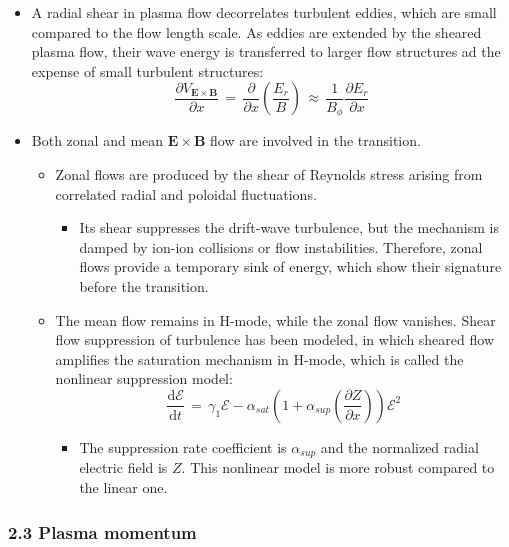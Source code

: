 \documentclass[]{article}
\providecommand{\tightlist}{%
  \setlength{\itemsep}{0pt}\setlength{\parskip}{0pt}}
\begin{document}
\begin{itemize}
\item
  A radial shear in plasma flow decorrelates turbulent eddies, which are
  small compared to the flow length scale. As eddies are extended by the
  sheared plasma flow, their wave energy is transferred to larger flow
  structures ad the expense of small turbulent structures:
  \[\frac{\partial V_{\mathbf{E}\times\mathbf{B}}}{\partial x} \,=\, \frac{\partial}{\partial x} \left(\frac{E_r}{B}\right) \,\approx\, \frac{1}{B_\phi} \frac{\partial E_r}{\partial x}\]
\item
  Both zonal and mean \(\mathbf{E}\times\mathbf{B}\) flow are involved
  in the transition.

  \begin{itemize}
  \item
    Zonal flows are produced by the shear of Reynolds stress arising
    from correlated radial and poloidal fluctuations.

    \begin{itemize}
    \tightlist
    \item
      Its shear suppresses the drift-wave turbulence, but the mechanism
      is damped by ion-ion collisions or flow instabilities. Therefore,
      zonal flows provide a temporary sink of energy, which show their
      signature before the transition.
    \end{itemize}
  \item
    The mean flow remains in H-mode, while the zonal flow vanishes.
    Shear flow suppression of turbulence has been modeled, in which
    sheared flow amplifies the saturation mechanism in H-mode, which is
    called the nonlinear suppression model:
    \[\frac{\text{d}\mathcal{E}}{\text{d}t} \,=\, \gamma_1 \mathcal{E} - \alpha_{sat} \left(1 + \alpha_{sup} \left(\frac{\partial Z}{\partial x}\right)\right) \mathcal{E}^2\]

    \begin{itemize}
    \tightlist
    \item
      The suppression rate coefficient is \(\alpha_{sup}\) and the
      normalized radial electric field is \(Z\). This nonlinear model is
      more robust compared to the linear one.
    \end{itemize}
  \end{itemize}
\end{itemize}

\subsubsection{2.3 Plasma momentum}\label{plasma-momentum}
\end{document}
